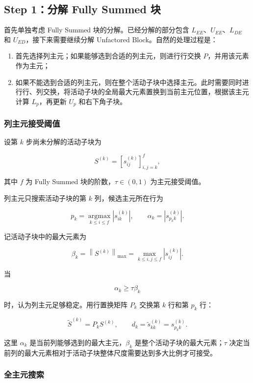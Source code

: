 \subsection{Step 1：分解 Fully Summed 块}

首先单独考虑 Fully Summed 块的分解。已经分解的部分包含 $L_{EE}$、$U_{EE}$、$L_{DE}$ 和 $U_{ED}$，接下来需要继续分解 Unfactored Block。自然的处理过程是：

\begin{enumerate}
  \item 首先选择列主元；如果能够选到合适的列主元，则进行行交换 $P$，并用该元素作为主元；
  \item 如果不能选到合适的列主元，则在整个活动子块中选择主元。此时需要同时进行行、列交换，将活动子块的全局最大元素置换到当前主元位置，根据该主元计算 $L_p$，再更新 $U_p$ 和右下角子块。
\end{enumerate}

\subsubsection{列主元接受阈值}

设第 $k$ 步尚未分解的活动子块为

\[
S^{(k)}=\left[s_{ij}^{(k)}\right]_{i,j=k}^{f},
\]

其中 $f$ 为 Fully Summed 块的阶数，$\tau\in(0,1)$ 为主元接受阈值。

列主元只搜索活动子块的第 $k$ 列，候选主元所在行为

\[
p_k=\underset{k\le i\le f}{\operatorname{argmax}}
      \left|s_{ik}^{(k)}\right|,
\qquad
\alpha_k=\left|s_{p_k k}^{(k)}\right|.
\]

记活动子块中的最大元素为

\[
\beta_k=\left\|S^{(k)}\right\|_{\max}
=\max_{k\le i,j\le f}\left|s_{ij}^{(k)}\right|.
\]

当

\[
\alpha_k\ge\tau\beta_k
\]

时，认为列主元足够稳定。用行置换矩阵 $P_k$ 交换第 $k$ 行和第 $p_k$ 行：

\[
\widetilde S^{(k)}=P_kS^{(k)},
\qquad
d_k=\widetilde s_{kk}^{(k)}=s_{p_k k}^{(k)}.
\]

这里 $\alpha_k$ 是当前列能够选到的最大主元，$\beta_k$ 是整个活动子块的最大元素；$\tau$ 决定当前列的最大元素相对于活动子块整体尺度需要达到多大比例才可接受。

\subsubsection{全主元搜索}

